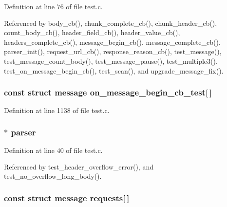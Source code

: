Definition at line 76 of file test.\+c.



Referenced by body\+\_\+cb(), chunk\+\_\+complete\+\_\+cb(), chunk\+\_\+header\+\_\+cb(), count\+\_\+body\+\_\+cb(), header\+\_\+field\+\_\+cb(), header\+\_\+value\+\_\+cb(), headers\+\_\+complete\+\_\+cb(), message\+\_\+begin\+\_\+cb(), message\+\_\+complete\+\_\+cb(), parser\+\_\+init(), request\+\_\+url\+\_\+cb(), response\+\_\+reason\+\_\+cb(), test\+\_\+message(), test\+\_\+message\+\_\+count\+\_\+body(), test\+\_\+message\+\_\+pause(), test\+\_\+multiple3(), test\+\_\+on\+\_\+message\+\_\+begin\+\_\+cb(), test\+\_\+scan(), and upgrade\+\_\+message\+\_\+fix().

\subsubsection[{on\+\_\+message\+\_\+begin\+\_\+cb\+\_\+test}]{\setlength{\rightskip}{0pt plus 5cm}const struct {\bf message} on\+\_\+message\+\_\+begin\+\_\+cb\+\_\+test[$\,$]}\label{test_8c_a6d471bdf4e4d79f57593be0fbb94539b}


Definition at line 1138 of file test.\+c.

\subsubsection[{parser}]{$\ast$ parser\hspace{0.3cm}{\ttfamily [static]}}\label{test_8c_a9c0d3db3dd6b37fbe78193fb322e97dd}


Definition at line 40 of file test.\+c.



Referenced by test\+\_\+header\+\_\+overflow\+\_\+error(), and test\+\_\+no\+\_\+overflow\+\_\+long\+\_\+body().

\subsubsection[{requests}]{\setlength{\rightskip}{0pt plus 5cm}const struct {\bf message} requests[$\,$]}\label{test_8c_a2f5f4226fdae63a5d7d98b3cc56a685d}


